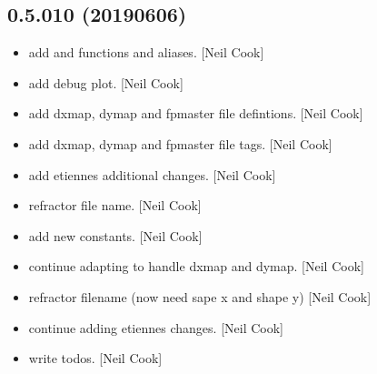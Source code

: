 \documentclass[a4paper,10pt,english]{report}
\begin{document}
\subsection{0.5.010 (2019\sphinxhyphen{}06\sphinxhyphen{}06)}
\label{\detokenize{misc/changelog:id146}}\begin{itemize}
\item {} 
 \sphinxhyphen{} add  and  functions and
aliases. {[}Neil Cook{]}

\item {} 
 \sphinxhyphen{} add  debug plot. {[}Neil
Cook{]}

\item {} 
 \sphinxhyphen{} add dxmap, dymap and fpmaster file defintions. {[}Neil
Cook{]}

\item {} 
 \sphinxhyphen{} add dxmap, dymap and fpmaster file tags. {[}Neil Cook{]}

\item {} 
 \sphinxhyphen{} add etiennes additional changes. {[}Neil Cook{]}

\item {} 
 \sphinxhyphen{} refractor file name. {[}Neil Cook{]}

\item {} 
 \sphinxhyphen{} add new  constants. {[}Neil Cook{]}

\item {} 
 \sphinxhyphen{} continue adapting  to handle
dxmap and dymap. {[}Neil Cook{]}

\item {} 
 \sphinxhyphen{} refractor filename (now need sape x and shape y)
{[}Neil Cook{]}

\item {} 
 \sphinxhyphen{} continue adding etiennes changes. {[}Neil Cook{]}

\item {} 
 \sphinxhyphen{} write todos. {[}Neil Cook{]}

\end{itemize}
\end{document}

